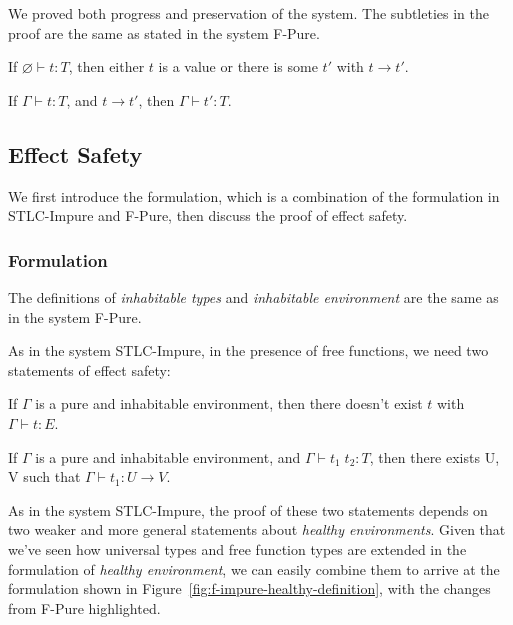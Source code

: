 We proved both progress and preservation of the system. The subtleties
in the proof are the same as stated in the system F-Pure.

\begin{theorem}[Progress]
If $\varnothing \vdash t : T$, then either $t$ is a value or there is some
$t'$ with $t \longrightarrow t'$.
\end{theorem}

\begin{theorem}[Preservation]
If $\Gamma \vdash t : T$, and $t \longrightarrow t'$, then $\Gamma
\vdash t' : T$.
\end{theorem}

\subsection{Effect Safety}

We first introduce the formulation, which is a combination of the
formulation in STLC-Impure and F-Pure, then discuss the proof of
effect safety.

\subsubsection{Formulation}

The definitions of \emph{inhabitable types} and \emph{inhabitable
  environment} are the same as in the system F-Pure.

As in the system STLC-Impure, in the presence of free functions, we
need two statements of effect safety:

\begin{definition}
  If $\Gamma$ is a pure and inhabitable environment, then there
  doesn't exist $t$ with $\Gamma \vdash t : E$.
\end{definition}

\begin{definition}
  If $\Gamma$ is a pure and inhabitable environment, and
  $\Gamma \vdash t_1 \; t_2 : T$, then there exists U, V such that
  $\Gamma \vdash t_1 : U \to V$.
\end{definition}


As in the system STLC-Impure, the proof of these two statements
depends on two weaker and more general statements about \emph{healthy
  environments}. Given that we've seen how universal types and free
function types are extended in the formulation of \emph{healthy
  environment}, we can easily combine them to arrive at the
formulation shown in Figure~\ref{fig:f-impure-healthy-definition},
with the changes from F-Pure highlighted.

